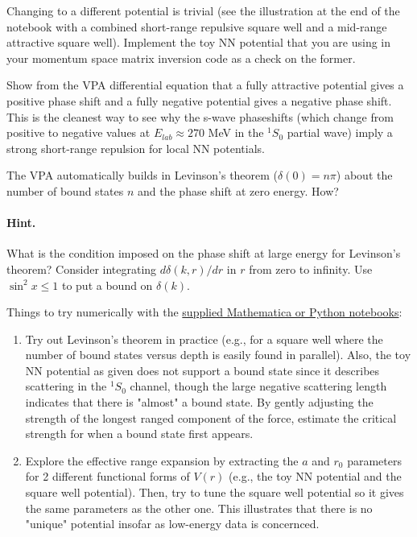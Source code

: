 \documentclass[%
oneside,                 %
final,                   %
10pt]{article}
\begin{document}
Changing to a different potential is trivial (see the illustration at the end of the notebook with a combined short-range repulsive
square well and a mid-range attractive square well).  Implement the toy NN potential that you are using in your momentum space matrix inversion code as a check on the former. 

Show from the VPA differential equation that a fully attractive potential gives
a positive phase shift and a fully negative potential gives a
negative phase shift. This is the cleanest way to see why the s-wave phaseshifts (which change from positive to negative values at $E_{lab}\approx 270$ MeV in the $^1S_0$ partial wave) imply a strong short-range repulsion for local NN potentials.

The VPA automatically builds in Levinson's theorem ($\delta(0) = n\pi$) about the number
of bound states $n$ and the phase shift at zero energy.  How?
\paragraph{Hint.}

What is the
condition imposed on the phase shift at large energy for Levinson's theorem?  Consider
integrating $d\delta(k,r)/dr$ in $r$ from zero to infinity.  Use $\sin^2 x \leq 1$
to put a bound on $\delta(k)$.



Things to try numerically with the \href{{https://github.com/ManyBodyPhysics/NuclearForces/tree/master/doc/Projects/2017/Project1}}{supplied Mathematica or Python notebooks}:
\begin{enumerate}
 \item Try out Levinson's theorem in practice (e.g., for a square well where the number of bound states versus depth is easily found in parallel). Also, the toy NN potential as given does not support a bound state since it describes scattering in the $^1S_0$ channel, though the large negative scattering length indicates that there is "almost" a bound state. By gently adjusting the strength of the longest ranged component of the force, estimate the critical strength for when a bound state first appears. 

 \item Explore the effective range expansion by extracting the $a$ and $r_0$ parameters for 2 different functional forms of $V(r)$ (e.g., the toy NN potential and the square well potential). Then, try to tune the square well potential so it gives the same parameters as the other one. This illustrates that there is no "unique" potential insofar as low-energy data is concernced.
\end{enumerate}
\end{document}
